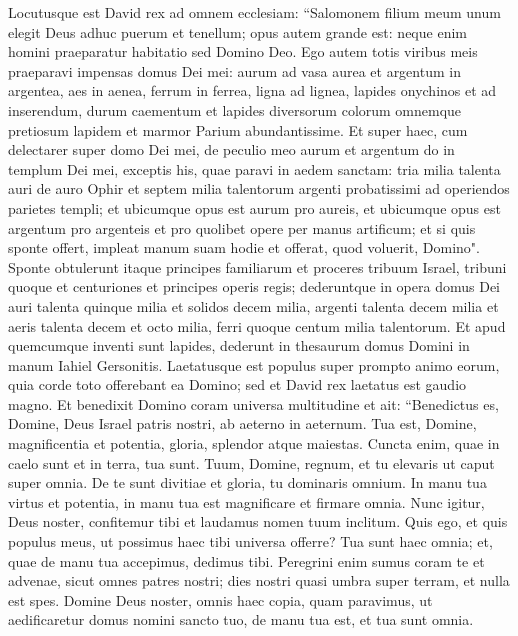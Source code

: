 \begin{biblechapter}  
\verse Locutusque est David rex ad omnem ecclesiam: “Salomonem filium meum unum elegit Deus adhuc puerum et tenellum; opus autem grande est: neque enim homini praeparatur habitatio sed Domino Deo. 
\verse Ego autem totis viribus meis praeparavi impensas domus Dei mei: aurum ad vasa aurea et argentum in argentea, aes in aenea, ferrum in ferrea, ligna ad lignea, lapides onychinos et ad inserendum, durum caementum et lapides diversorum colorum omnemque pretiosum lapidem et marmor Parium abundantissime. 
\verse Et super haec, cum delectarer super domo Dei mei, de peculio meo aurum et argentum do in templum Dei mei, exceptis his, quae paravi in aedem sanctam: 
\verse tria milia talenta auri de auro Ophir et septem milia talentorum argenti probatissimi ad operiendos parietes templi; 
\verse et ubicumque opus est aurum pro aureis, et ubicumque opus est argentum pro argenteis et pro quolibet opere per manus artificum; et si quis sponte offert, impleat manum suam hodie et offerat, quod voluerit, Domino". 
\verse Sponte obtulerunt itaque principes familiarum et proceres tribuum Israel, tribuni quoque et centuriones et principes operis regis; 
\verse dederuntque in opera domus Dei auri talenta quinque milia et solidos decem milia, argenti talenta decem milia et aeris talenta decem et octo milia, ferri quoque centum milia talentorum. 
\verse Et apud quemcumque inventi sunt lapides, dederunt in thesaurum domus Domini in manum Iahiel Gersonitis. 
\verse Laetatusque est populus super prompto animo eorum, quia corde toto offerebant ea Domino; sed et David rex laetatus est gaudio magno. 
\verse Et benedixit Domino coram universa multitudine et ait: “Benedictus es, Domine, Deus Israel patris nostri, ab aeterno in aeternum. 
\verse Tua est, Domine, magnificentia et potentia, gloria, splendor atque maiestas. Cuncta enim, quae in caelo sunt et in terra, tua sunt. Tuum, Domine, regnum, et tu elevaris ut caput super omnia. 
\verse De te sunt divitiae et gloria, tu dominaris omnium. In manu tua virtus et potentia, in manu tua est magnificare et firmare omnia. 
\verse Nunc igitur, Deus noster, confitemur tibi et laudamus nomen tuum inclitum. 
\verse Quis ego, et quis populus meus, ut possimus haec tibi universa offerre? Tua sunt haec omnia; et, quae de manu tua accepimus, dedimus tibi. 
\verse Peregrini enim sumus coram te et advenae, sicut omnes patres nostri; dies nostri quasi umbra super terram, et nulla est spes.  
\verse Domine Deus noster, omnis haec copia, quam paravimus, ut aedificaretur domus nomini sancto tuo, de manu tua est, et tua sunt omnia. 

\end{biblechapter}
